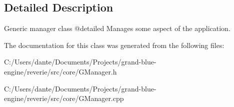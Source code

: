 \subsection{Detailed Description}
Generic manager class @detailed Manages some aspect of the application. 

The documentation for this class was generated from the following files\+:\begin{DoxyCompactItemize}
\item 
C\+:/\+Users/dante/\+Documents/\+Projects/grand-\/blue-\/engine/reverie/src/core/G\+Manager.\+h\item 
C\+:/\+Users/dante/\+Documents/\+Projects/grand-\/blue-\/engine/reverie/src/core/G\+Manager.\+cpp\end{DoxyCompactItemize}
